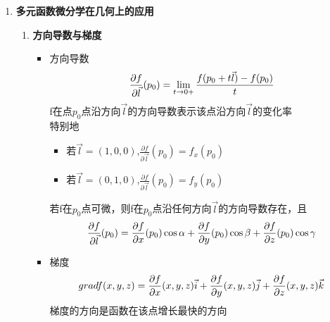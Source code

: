 \documentclass[12pt]{scrartcl}
\begin{document}
{\begin{enumerate}
\begin{enumerate}
    \end{enumerate}
    \item  \textbf{多元函数微分学在几何上的应用}
    \begin{enumerate}
        \item \textbf{方向导数与梯度}
        \begin{itemize}
            \item 方向导数
            \begin{equation}
                \frac{\partial f}{\partial \vec{l}}(p_0)=\lim_{t \to 0+}\frac{f(p_0+t\vec{l})-f(p_0)}{t} \notag 
            \end{equation}
            f在点$p_0$点沿方向$\vec{l}$的方向导数表示该点沿方向$\vec{l}$的变化率\\
            特别地
            \begin{itemize}
                \item 若$\vec{l}=(1,0,0)$,$\frac{\partial f}{\partial \vec{l}}(p_0)=f_x(p_0)$
                \item 若$\vec{l}=(0,1,0)$,$\frac{\partial f}{\partial \vec{l}}(p_0)=f_y(p_0)$
            \end{itemize}
            若f在$p_0$点可微，则f在$p_0$点沿任何方向$\vec{l}$的方向导数存在，且
            \begin{equation}
                \frac{\partial f}{\partial \vec{l}}(p_0)=
                \frac{\partial f}{\partial x}(p_0)\cos \alpha+
                \frac{\partial f}{\partial y}(p_0)\cos \beta+
                \frac{\partial f}{\partial z}(p_0)\cos \gamma \notag
            \end{equation}
            \item 梯度
            \begin{equation}
                gradf(x,y,z)=
                \frac{\partial f}{\partial x}(x,y,z)\vec{i}+
                \frac{\partial f}{\partial y}(x,y,z)\vec{j}+
                \frac{\partial f}{\partial z}(x,y,z)\vec{k} \notag
            \end{equation}
            梯度的方向是函数在该点增长最快的方向
        \end{itemize}
        

\end{enumerate}
\end{enumerate}}
\end{document}
